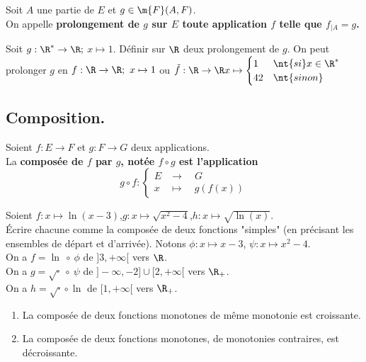 \documentclass[11pt]{article}
\begin{document}
\begin{defi}{}{}
    Soit $A$ une partie de $E$ et $g\in\m{F}(A,F)$.\\
    On appelle \bf{prolongement} de $g$ sur $E$ toute application $f$ telle que $f_{|A}=g$.
\end{defi}

\begin{ex}{}{}
    Soit $g:\R^*\to\R;$ $x\mapsto 1$. Définir sur $\R$ deux prolongement de $g$.
    \tcblower
    On peut prolonger $g$ en $f:\R\to\R;~x\mapsto 1$ ou $\tilde{f}:\R\to\R x\mapsto \begin{cases}1&\nt{si }x\in\R^*\\42&\nt{sinon}\end{cases}$
\end{ex}

\subsection{Composition.}

\begin{defi}{}{}
    Soient $f:E\to F$ et $g:F\to G$ deux applications.\\
    La \bf{composée} de $f$ par $g$, notée $f\circ g$ est l'application
    \begin{equation*}
        g\circ f:\begin{cases}
            E&\to\quad G\\
            x&\mapsto\quad g(f(x))
        \end{cases}
    \end{equation*}
\end{defi}

\begin{ex}{}{}
    Soient $f:x\mapsto\ln(x-3)$,\quad $g:x\mapsto\sqrt{x^2-4}$,\quad$h:x\mapsto\sqrt{\ln(x)}$.\\
    Écrire chacune comme la composée de deux fonctions "simples" (en précisant les ensembles de départ et d'arrivée).
    \tcblower
    Notons $\phi:x\mapsto x-3$, $\psi:x\mapsto x^2-4$.\\
    On a $f=\ln~\circ~\phi$ de $]3,+\infty[$ vers $\R$.\\
    On a $g=\sqrt{\cdot}~\circ~\psi$ de $]-\infty,-2]\cup[2,+\infty[$ vers $\R_+$.\\
    On a $h=\sqrt{\cdot}\circ \ln$ de $[1,+\infty[$ vers $\R_+$.
\end{ex}

\begin{ex}{}{}
    \begin{enumerate}
        \item La composée de deux fonctions monotones de même monotonie est croissante.
        \item La composée de deux fonctions monotones, de monotonies contraires, est décroissante.
    \end{enumerate}
\end{ex}
\end{document}
